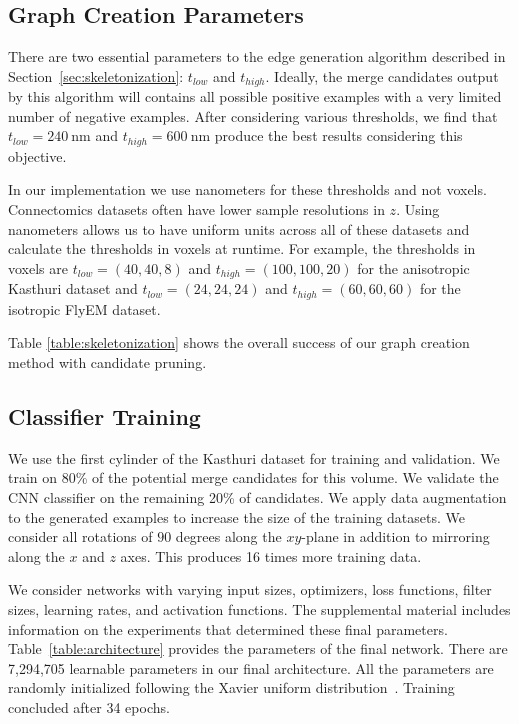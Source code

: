 \subsection{Graph Creation Parameters}

There are two essential parameters to the edge generation algorithm described in Section~\ref{sec:skeletonization}: $t_{low}$ and $t_{high}$. Ideally, the merge candidates output by this algorithm will contains all possible positive examples with a very limited number of negative examples. After considering various thresholds, we find that $t_{low} = \SI{240}{\nano\meter}$ and $t_{high} = \SI{600}{\nano\meter}$ produce the best results considering this objective.

In our implementation we use nanometers for these thresholds and not voxels. Connectomics datasets often have lower sample resolutions in $z$. Using nanometers allows us to have uniform units across all of these datasets and calculate the thresholds in voxels at runtime. For example, the thresholds in voxels are $t_{low} = (40, 40, 8)$ and $t_{high} = (100, 100, 20)$ for the anisotropic Kasthuri dataset and $t_{low} = (24, 24, 24)$ and $t_{high} = (60, 60, 60)$ for the isotropic FlyEM dataset.

Table \ref{table:skeletonization} shows the overall success of our graph creation method with candidate pruning. 

\subsection{Classifier Training}
\label{sec:network-parameters}

We use the first cylinder of the Kasthuri dataset  for training and validation. We train on 80\% of the potential merge candidates for this volume.
We validate the CNN classifier on the remaining 20\% of candidates. We apply data augmentation to the generated examples to increase the size of the training datasets. We consider all rotations of $90$ degrees along the $xy$-plane in addition to mirroring along the $x$ and $z$ axes. This produces 16 times more training data.

We consider networks with varying input sizes, optimizers, loss functions, filter sizes, learning rates, and activation functions. The supplemental material includes information on the experiments that determined these final parameters. Table~\ref{table:architecture} provides the parameters of the final network. There are 7,294,705 learnable parameters in our final architecture. All the parameters are randomly initialized following the Xavier uniform distribution~\cite{glorot2010understanding}. Training concluded after 34 epochs.

